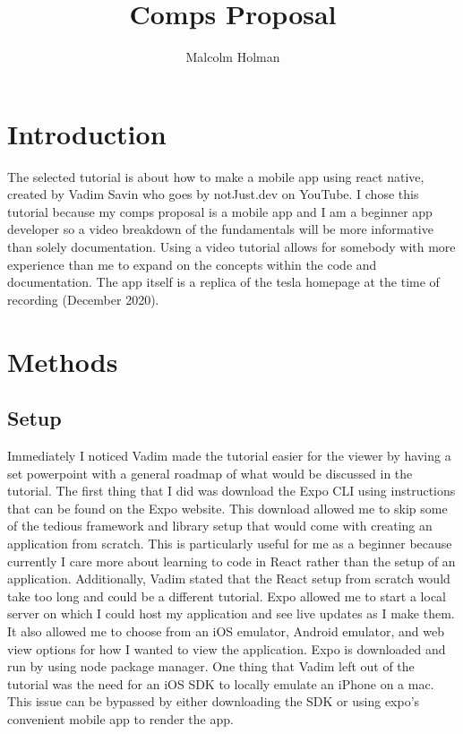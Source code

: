 \documentclass[10pt,twocolumn]{article}
\title{Comps Proposal}
\author{Malcolm Holman}
\affiliation{Occidental College}
\begin{document}
\maketitle

\section{Introduction}
    
    The selected tutorial is about how to make a mobile app using react native, created by Vadim Savin who goes by notJust.dev on YouTube. I chose this tutorial because my comps proposal is a mobile app and I am a beginner app developer so a video breakdown of the fundamentals will be more informative than solely documentation. Using a video tutorial allows for somebody with more experience than me to expand on the concepts within the code and documentation. The app itself is a replica of the tesla homepage at the time of recording (December 2020).
\section{Methods}
\subsection{Setup}

    Immediately I noticed Vadim made  the tutorial easier for the viewer by having a set powerpoint with a general roadmap of what would be discussed in the tutorial. The first thing that I did was download the Expo CLI using instructions that can be found on the Expo website. This download allowed me to skip some of the tedious framework and library setup that would come with creating an application from scratch. This is particularly useful for me as a beginner because currently I care more about learning to code in React rather than the setup of an application. Additionally, Vadim stated that the React setup from scratch would take too long and could be a different tutorial. Expo allowed me to start a local server on which I could host my application and see live updates as I make them. It also allowed me to choose from an iOS emulator, Android emulator, and web view options for how I wanted to view the application. Expo is downloaded and run by using node package manager. One thing that Vadim left out of the tutorial was the need for an iOS SDK to locally emulate an iPhone on a mac. This issue can be bypassed by either downloading the SDK or using expo’s convenient mobile app to render the app. 
    
\end{document}
